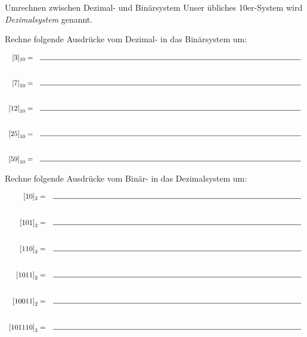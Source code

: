 \documentclass{../../../zirkelblatt}
\begin{document}
\pagebreak

\begin{aufgabe}{Umrechnen zwischen Dezimal- und Binärsystem}
Unser übliches 10er-System wird \emph{Dezimalsystem} genannt.

Rechne folgende Ausdrücke vom Dezimal- in das Binärsystem um:

\[\begin{array}{rr}
[3]_{10} = & \rule{13cm}{0.5px}
\\\\\\
\left[ 7 \right]_{10} = & \rule{13cm}{0.5px} \\
\\\\
\left[ 12 \right]_{10} = & \rule{13cm}{0.5px} \\
\\\\
\left[ 25 \right]_{10} = & \rule{13cm}{0.5px} \\
\\\\
\left[ 59 \right]_{10} = & \rule{13cm}{0.5px}
\end{array}\]

\vspace{1cm}

Rechne folgende Ausdrücke vom Binär- in das Dezimalsystem um:

\[\begin{array}{rr}
[10]_{2} = & \rule{12cm}{0.5px}
\\\\\\
\left[ 101 \right]_{2} = & \rule{12cm}{0.5px} \\
\\\\
\left[ 110 \right]_{2} = & \rule{12cm}{0.5px} \\
\\\\
\left[ 1011 \right]_{2} = & \rule{12cm}{0.5px} \\
\\\\
\left[ 10011 \right]_{2} = & \rule{12cm}{0.5px} \\
\\\\
\left[ 101110 \right]_{2} = & \rule{12cm}{0.5px}
\end{array}\]
\end{aufgabe}
\end{document}
